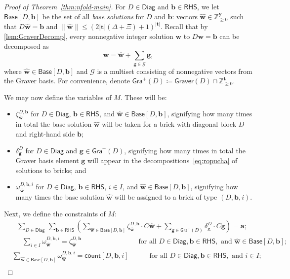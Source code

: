\documentclass{theoretics}
\renewcommand{\leq}{\leqslant}
\renewcommand{\geq}{\geqslant}
\newcommand{\Z}{\mathbb{Z}}
\newcommand{\Zn}{\Z_{\geq 0}}
\newcommand{\tup}[1]{{\mathbf{#1}}}
\newcommand{\ww}{\tup w}
\newcommand{\whww}{{\widehat{\ww}}}
\newcommand{\yy}{\tup y}
\newcommand{\tv}{\tup t}
\newcommand{\av}{\tup a}
\newcommand{\bb}{\tup b}
\renewcommand{\gg}{\tup g}
\newcommand{\Graver}{\mathsf{Graver}}
\newcommand{\Gg}{\mathcal{G}}
\newcommand{\RHS}{\mathsf{RHS}}
\newcommand{\Diag}{\mathsf{Diag}}
\newcommand{\Base}{\mathsf{Base}}
\newcommand{\Gra}{\mathsf{Gra}^+}
\newcommand{\cntTypes}{\mathsf{count}}
\begin{document}
\begin{proof}[Proof of Theorem~\ref{thm:nfold-main}]
For $D\in \Diag$ and $\bb\in \RHS$, we let $\Base[D,\bb]$ be the set of all {\em{base solutions}} for $D$ and $\bb$: vectors $\whww\in \Zn^\yy$ such that $D\whww=\bb$ and $\|\whww\|\leq (2|\tv|(\Delta+\Xi)+1)^{|\tv|}$. Recall that by \cref{lem:GraverDecomp}, every nonnegative integer solution $\ww$ to $D\ww=\bb$ can be decomposed as
\begin{equation}\label{eq:ropucha}
\ww = \whww+\sum_{\gg\in \Gg} \gg,
\end{equation}
where $\whww\in \Base[D,\bb]$ and $\Gg$ is a multiset consisting of nonnegative vectors from the Graver basis. For convenience, denote $\Gra(D)\coloneqq \Graver(D)\cap \Zn^\tv$.

We may now define the variables of $M$. These will be:
\begin{itemize}[nosep]
    \item $\zeta^{D,\bb}_\whww$ for $D\in \Diag$, $\bb\in \RHS$, and $\whww\in \Base[D,\bb]$, signifying how many times in total the base solution $\whww$ will be taken for a brick with diagonal block $D$ and right-hand side $\bb$;
    \item $\delta^D_\gg$ for $D\in \Diag$ and $\gg\in \Gra(D)$, signifying how many times in total the Graver basis element $\gg$ will appear in the decompositions~\cref{eq:ropucha} of solutions to bricks; and
    \item $\omega^{D,\bb,i}_{\whww}$ for $D\in \Diag$, $\bb\in \RHS$, $i\in I$, and $\whww\in \Base[D,\bb]$, signifying how many times the base solution $\whww$ will be assigned to a brick of type $(D,\bb,i)$.
\end{itemize}
Next, we define the constraints of $M$:
\begin{align*}
&\ \ \ \sum_{D\in \Diag}\,\sum_{\bb\in \RHS}\left( \sum_{\whww\in \Base{[D,\bb]}} \zeta^{D,\bb}_{\whww}\cdot C\whww + \sum_{\gg\in \Gra(D)} \delta^D_\gg\cdot C\gg \right)  = \av;
& \tag{C1} \label{IP:FindSolAss1} \\
&\quad\ \ \sum_{i\in I} \omega^{D,\bb,i}_{\whww} = \zeta^{D,\bb}_{\whww} \qquad\qquad\qquad\qquad\  \textrm{for all }D\in \Diag, \bb\in \RHS, \textrm{ and } \whww\in \Base[D,\bb]; & \tag{C2} \label{IP:FindSolAss3} \\
& \sum_{\whww\in \Base[D,\bb]} \omega^{D,\bb,i}_{\whww} = \cntTypes[D,\bb,i] \qquad\quad \textrm{for all }D\in \Diag, \bb\in \RHS, \textrm{ and } i\in I; & \tag{C3} \label{IP:FindSolAss4} \\

\end{align*}
\end{proof}
\end{document}
